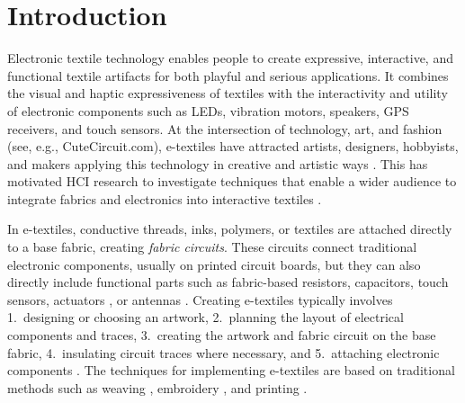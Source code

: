 \documentclass[header.tex]{subfiles}
\begin{document}

\keywords{\plainkeywords}

\section{Introduction}


Electronic textile technology enables people to create expressive, interactive, and functional textile artifacts for both playful and serious applications.
It combines the visual and haptic expressiveness of textiles with the interactivity and utility of electronic components such as LEDs, vibration motors, speakers, GPS receivers, and touch sensors. At the intersection of technology, art, and fashion (see, e.g., CuteCircuit.com), e-textiles have attracted artists, designers, hobbyists, and makers applying this technology in creative and artistic ways \cite{berzowska2005kukkia,Buechley:2010:LWH:1858171.1858206}. 
This has motivated HCI research to investigate techniques that enable a wider audience to integrate fabrics and electronics into interactive textiles \cite{Buechley2009,perner2011handcrafting,5387040}.

In e-textiles, conductive threads, inks, polymers, or textiles are attached directly to a base fabric, creating \textit{fabric circuits}. These circuits connect traditional electronic components, usually on printed circuit boards, but they can also directly include functional parts such as fabric-based resistors, capacitors, touch sensors, actuators \cite{stylios2007shape}, or antennas \cite{catrysse2004towards}.
Creating e-textiles typically involves 1.\ designing or choosing an artwork, 2.\ planning the layout of electrical components and traces, 3.\ creating the artwork and fabric circuit on the base fabric, 4.\ insulating circuit traces where necessary, and 5.\ attaching electronic components \cite{Lovell:2010:ETD:1810543.1810578}. 
The techniques for implementing e-textiles are based on traditional methods such as weaving \cite{kallmayer2003new}, embroidery \cite{5387040}, and printing \cite{kim2010electrical}.

\end{document}
